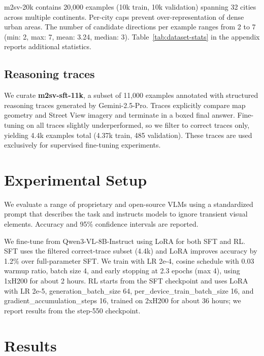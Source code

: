 \documentclass{article}
\begin{document}
m2sv-20k contains 20,000 examples (10k train, 10k validation) spanning 32 cities across multiple continents.
Per-city caps prevent over-representation of dense urban areas. The number of
candidate directions per example ranges from 2 to 7 (min: 2, max: 7, mean: 3.24,
median: 3). Table~\ref{tab:dataset-stats} in the appendix reports additional statistics.


\subsection{Reasoning traces}

We curate \textbf{m2sv-sft-11k}, a subset of 11,000 examples annotated with
structured reasoning traces generated by Gemini-2.5-Pro. Traces explicitly
compare map geometry and Street View imagery and terminate in a boxed final
answer. Fine-tuning on all traces slightly underperformed, so we filter to
correct traces only, yielding 4.4k examples total (4.37k train, 485 validation).
These traces are used exclusively for supervised fine-tuning experiments.

\section{Experimental Setup}

We evaluate a range of proprietary and open-source VLMs using a standardized
prompt that describes the task and instructs models to ignore transient visual
elements. Accuracy and 95\% confidence intervals are reported.

We fine-tune from Qwen3-VL-8B-Instruct using LoRA for both SFT and RL. SFT uses
the filtered correct-trace subset (4.4k) and LoRA improves accuracy by 1.2\%
over full-parameter SFT. We train with LR 2e-4, cosine schedule with 0.03 warmup
ratio, batch size 4, and early stopping at 2.3 epochs (max 4), using 1xH200 for
about 2 hours. RL starts from the SFT checkpoint and uses LoRA with LR 2e-5,
generation\_batch\_size 64, per\_device\_train\_batch\_size 16, and gradient\_accumulation\_steps 16,
trained on 2xH200 for about 36 hours; we report results from the step-550
checkpoint.


\section{Results}
\label{sec:results}
\end{document}
